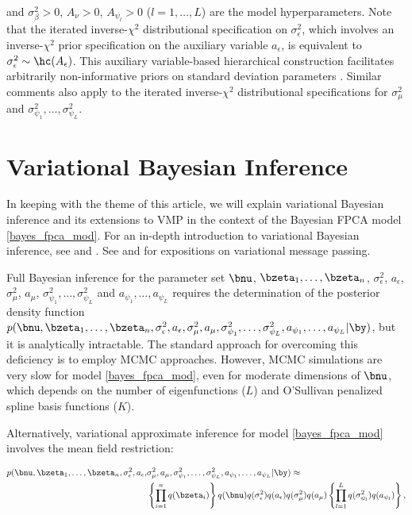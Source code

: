 \documentclass[ba]{imsart}
\numberwithin{equation}{section}
\theoremstyle{plain}
\def\sigsqeps{\sigma^2_{\epsilon}}
\def\sigsqbeta{\sigma^2_\beta}
\def\aeps{a_{\epsilon}}
\def\sigsqmu{\sigma^2_{\mu}}
\def\amu{a_{\mu}}
\newcommand\sigsqpsi[1]{\sigma^2_{\psi_{#1}}}
\newcommand\apsi[1]{a_{\psi_{#1}}}
\begin{document}
\noindent and $\sigsqbeta > 0$, $A_\nu > 0$,
$A_{\psi_l} > 0$ ($l = 1, \dots, L$) are the model hyperparameters.
Note that the iterated inverse-$\chi^2$ distributional specification on $\sigsqeps$,
which involves an inverse-$\chi^2$ prior specification on the auxiliary variable $\aeps$, is equivalent to $\sigsqeps \sim
\hc (A_{\epsilon})$. This auxiliary variable-based hierarchical construction facilitates arbitrarily non-informative
priors on standard deviation parameters \citep{gelman06}. Similar comments also apply to the iterated inverse-$\chi^2$
distributional specifications for $\sigsqmu$ and $\sigsqpsi{1}, \dots, \sigsqpsi{L}$.


\section{Variational Bayesian Inference}
\label{sec:vbi}

In keeping with the theme of this article, we will explain variational Bayesian inference and its extensions to
VMP in the context of the Bayesian FPCA model \eqref{bayes_fpca_mod}. For an
in-depth introduction to variational Bayesian inference, see \citet{ormerod10} and \citet{blei17}. See \citet{minka05}
and \citet{wand17} for expositions on variational message passing.

Full Bayesian inference for the parameter set $\bnu$, $\bzeta_1, \dots, \bzeta_n$, $\sigsqeps$, $\aeps$,
$\sigsqmu$, $\amu$, $\sigsqpsi{1}, \dots, \sigsqpsi{L}$ and $\apsi{1}, \dots, \apsi{L}$ requires the determination
of the posterior density function $p (\bnu, \bzeta_1, \dots, \allowbreak
\bzeta_n, \sigsqeps, \aeps, \sigsqmu, \amu,
\sigsqpsi{1}, \dots, \sigsqpsi{L}, \apsi{1}, \dots, \apsi{L} | \by)$, but it is analytically intractable.
The standard approach for overcoming this deficiency is to
employ MCMC approaches. However, MCMC
simulations are very slow for model \eqref{bayes_fpca_mod}, even for moderate dimensions of $\bnu$, which
depends on the number of eigenfunctions ($L$) and O'Sullivan penalized spline basis functions ($K$).

Alternatively, variational approximate inference for model \eqref{bayes_fpca_mod} involves
the mean field restriction:

\begin{align}
\begin{split}
	p (
		\bnu, \bzeta_1, \dots, \bzeta_n, \sigsqeps, \aeps, &\sigsqmu, \amu,
		\sigsqpsi{1}, \dots, \sigsqpsi{L}, \apsi{1}, \dots, \apsi{L} | \by
	) \approx \\
		&\left\{ \prod_{i=1}^n q (\bzeta_i) \right\} q (\bnu) q(\sigsqeps) q(\aeps)
        		q(\sigsqmu) q (\amu) \left\{ \prod_{l=1}^L q(\sigsqpsi{l}) q(\apsi{l}) \right\},
\end{split}
\label{fpca_mf_restrn}
\end{align}
\end{document}
